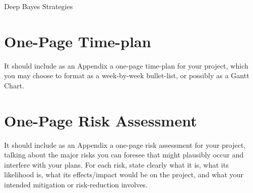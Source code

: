 \documentclass[ %
                    author={James Stephenson},
                supervisor={Dr. Edwin Simpson},
                    degree={MSc},
                     title={Project Plan: Bayesian Deep Learning For Extractive Test Summarisation},
                  subtitle={},
                      type={},
                      year={2022}]{../additions/dissertation}
\begin{document}
			Deep Bayes Strategies

		
	
	
	
	\backmatter
	
	
	
	
	
	\appendix
	
	\chapter{One-Page Time-plan}
		\label{appx:timeplan}
		
		It should include as an Appendix a one-page time-plan for your project, which you may choose to format as a week-by-week bullet-list, or possibly as a Gantt Chart. 
		
	\chapter{One-Page Risk Assessment}
		\label{appx:riskassessment}
		
		It should include as an Appendix a one-page risk assessment for your project, talking about the major risks you can foresee that might plausibly occur and interfere with your plans. For each risk, state clearly what it is, what its likelihood is, what its effects/impact would be on the project, and what your intended mitigation or risk-reduction involves.
		
\end{document}
